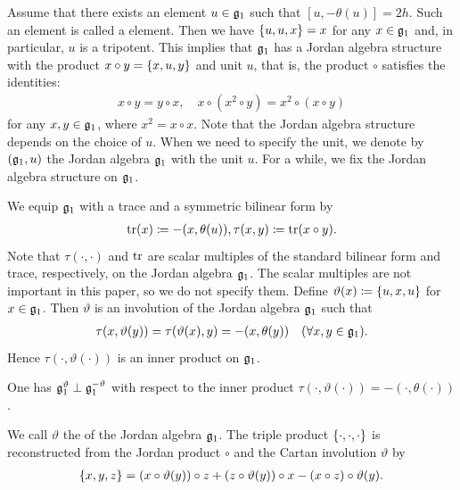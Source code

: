 Assume that there exists an element $u \in \mathfrak{g}_1$ such that $[u, -\theta(u)] = 2h$.
Such an element is called a  element.
Then we have $\{u, u, x\} = x$ for any $x \in \mathfrak{g}_1$ and, in particular, $u$ is a tripotent.
This implies that $\mathfrak{g}_1$ has a Jordan algebra structure with the product $x \circ y = \{x, u, y\}$ and unit $u$, that is, the product $\circ$ satisfies the identities:
\begin{align*}
	x\circ y = y\circ x, \quad x\circ (x^2 \circ y) = x^2 \circ (x\circ y)
\end{align*}
for any $x, y \in \mathfrak{g}_1$, where $x^2 = x\circ x$.
Note that the Jordan algebra structure depends on the choice of $u$.
When we need to specify the unit, we denote by $(\mathfrak{g}_1, u)$ the Jordan algebra $\mathfrak{g}_1$ with the unit $u$.
For a while, we fix the Jordan algebra structure on $\mathfrak{g}_1$.

We equip $\mathfrak{g}_1$ with a trace and a symmetric bilinear form by
\begin{align*}
	\mathrm{tr}(x) \coloneq -(x, \theta(u)), \tau(x, y) \coloneq \mathrm{tr}(x \circ y).
\end{align*}
Note that $\tau(\cdot, \cdot)$ and $\mathrm{tr}$ are scalar multiples of the standard bilinear form and trace, respectively, on the Jordan algebra $\mathfrak{g}_1$.
The scalar multiples are not important in this paper, so we do not specify them.
Define $\vartheta(x) \coloneq \{u, x, u\}$ for $x \in \mathfrak{g}_1$.
Then $\vartheta$ is an involution of the Jordan algebra $\mathfrak{g}_1$ such that
\begin{align*}
	\tau(x, \vartheta(y)) = \tau(\vartheta(x), y) = -(x, \theta(y)) \quad (\forall x, y \in \mathfrak{g}_1).
\end{align*}
Hence $\tau(\cdot, \vartheta(\cdot))$ is an inner product on $\mathfrak{g}_1$.

\begin{proposition} \label{prop:CartanInvOrthogonal}
	One has $\mathfrak{g}_1^{\vartheta} \perp \mathfrak{g}_1^{-\vartheta}$ with respect to the inner product $\tau(\cdot, \vartheta(\cdot)) = -(\cdot, \theta(\cdot))$.
\end{proposition}

We call $\vartheta$ the  of the Jordan algebra $\mathfrak{g}_1$.
The triple product $\{\cdot, \cdot, \cdot\}$ is reconstructed from the Jordan product $\circ$ and the Cartan involution $\vartheta$ by
\begin{align}
	\{x, y, z\} = (x \circ \vartheta(y)) \circ z + (z \circ \vartheta(y)) \circ x - (x \circ z) \circ \vartheta(y). \label{eqn:TripleProductFromJordanProduct}
\end{align}


